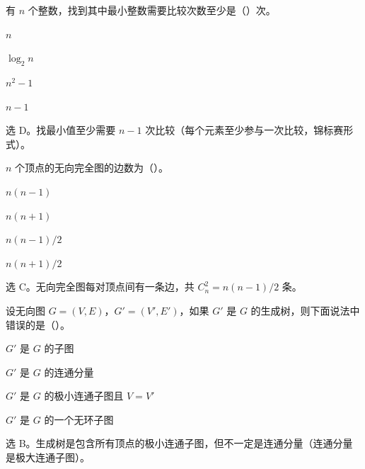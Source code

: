 \begin{question}
有 $n$ 个整数，找到其中最小整数需要比较次数至少是（\quad）次。
\begin{choiceoptions}[2]
  \item $n$
  \item $\log_2 n$
  \item $n^2-1$
  \item $n-1$
\end{choiceoptions}
\begin{solution}
选 D。找最小值至少需要 $n-1$ 次比较（每个元素至少参与一次比较，锦标赛形式）。
\end{solution}
\end{question}

\begin{question}
$n$ 个顶点的无向完全图的边数为（\quad）。
\begin{choiceoptions}[2]
  \item $n(n-1)$
  \item $n(n+1)$
  \item $n(n-1)/2$
  \item $n(n+1)/2$
\end{choiceoptions}
\begin{solution}
选 C。无向完全图每对顶点间有一条边，共 $C_n^2 = n(n-1)/2$ 条。
\end{solution}
\end{question}

\begin{question}
设无向图 $G=(V,E)$，$G'=(V',E')$，如果 $G'$ 是 $G$ 的生成树，则下面说法中错误的是（\quad）。
\begin{choiceoptions}[2]
  \item $G'$ 是 $G$ 的子图
  \item $G'$ 是 $G$ 的连通分量
  \item $G'$ 是 $G$ 的极小连通子图且 $V=V'$
  \item $G'$ 是 $G$ 的一个无环子图
\end{choiceoptions}
\begin{solution}
选 B。生成树是包含所有顶点的极小连通子图，但不一定是连通分量（连通分量是极大连通子图）。
\end{solution}
\end{question}


